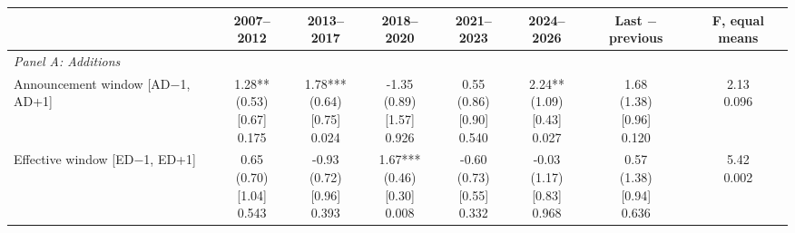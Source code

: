 \begin{threeparttable}
\begingroup
\renewcommand\cellalign{t}
\renewcommand\arraystretch{1}
\setlength{\tabcolsep}{5pt}
\begin{tabular}{@{}lccccccc}
\toprule
 & 2007–2012 & 2013–2017 & 2018–2020 & 2021–2023 & 2024–2026 & Last $-$ previous & F, equal means \\
\midrule
\emph{Panel A: Additions} \\
\addlinespace[0.25ex]
\addlinespace[1ex]
Announcement window [AD$-$1, AD+1] & \makecell{1.28**\\(0.53)\\{}[0.67]\\{0.175}} & \makecell{1.78***\\(0.64)\\{}[0.75]\\{0.024}} & \makecell{-1.35\\(0.89)\\{}[1.57]\\{0.926}} & \makecell{0.55\\(0.86)\\{}[0.90]\\{0.540}} & \makecell{2.24**\\(1.09)\\{}[0.43]\\{0.027}} & \makecell{1.68\\(1.38)\\{}[0.96]\\{0.120}} & \makecell{2.13\\{0.096}} \\
\addlinespace[0.25ex]
\addlinespace[0.25ex]
Effective window [ED$-$1, ED+1] & \makecell{0.65\\(0.70)\\{}[1.04]\\{0.543}} & \makecell{-0.93\\(0.72)\\{}[0.96]\\{0.393}} & \makecell{1.67***\\(0.46)\\{}[0.30]\\{0.008}} & \makecell{-0.60\\(0.73)\\{}[0.55]\\{0.332}} & \makecell{-0.03\\(1.17)\\{}[0.83]\\{0.968}} & \makecell{0.57\\(1.38)\\{}[0.94]\\{0.636}} & \makecell{5.42\\{0.002}} \\

\end{tabular}
\end{threeparttable}
